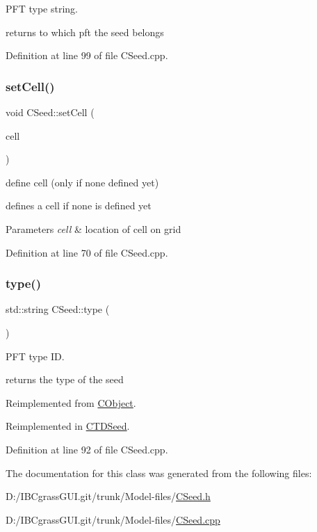 P\+FT type string. 

returns to which pft the seed belongs 

Definition at line 99 of file C\+Seed.\+cpp.

\mbox{\label{class_c_seed_a54b3d0dad6fbbaf13731df172190454f}} 
\subsubsection{\texorpdfstring{setCell()}{setCell()}}
{\footnotesize\ttfamily void C\+Seed\+::set\+Cell (\begin{DoxyParamCaption}\item[{\mbox{\hyperlink{class_c_cell}{C\+Cell}} $\ast$}]{cell }\end{DoxyParamCaption})}



define cell (only if none defined yet) 

defines a cell if none is defined yet 
\begin{DoxyParams}{Parameters}
{\em cell} & location of cell on grid \\
\hline
\end{DoxyParams}


Definition at line 70 of file C\+Seed.\+cpp.

\mbox{\label{class_c_seed_a0e10c5ee3d7a6bf14226de5a5728b2a4}} 
\subsubsection{\texorpdfstring{type()}{type()}}
{\footnotesize\ttfamily std\+::string C\+Seed\+::type (\begin{DoxyParamCaption}{ }\end{DoxyParamCaption})\hspace{0.3cm}{\ttfamily [virtual]}}



P\+FT type ID. 

returns the type of the seed 

Reimplemented from \mbox{\hyperlink{class_c_object_aa734daa745223aa287c3fdfb8dfca1ed}{C\+Object}}.



Reimplemented in \mbox{\hyperlink{class_c_t_d_seed_af15f2e2f2ce991668da778d421b8a4ee}{C\+T\+D\+Seed}}.



Definition at line 92 of file C\+Seed.\+cpp.



The documentation for this class was generated from the following files\+:\begin{DoxyCompactItemize}
\item 
D\+:/\+I\+B\+Cgrass\+G\+U\+I.\+git/trunk/\+Model-\/files/\mbox{\hyperlink{_c_seed_8h}{C\+Seed.\+h}}\item 
D\+:/\+I\+B\+Cgrass\+G\+U\+I.\+git/trunk/\+Model-\/files/\mbox{\hyperlink{_c_seed_8cpp}{C\+Seed.\+cpp}}\end{DoxyCompactItemize}
